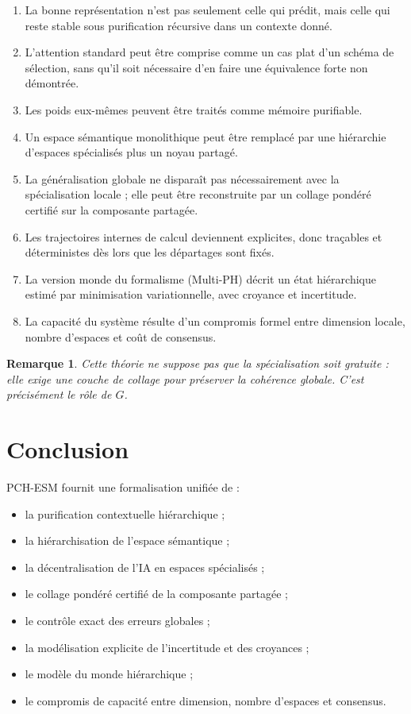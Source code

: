 \documentclass[11pt,a4paper]{article}
\newtheorem{remark}{Remarque}[section]
\newcommand{\1}{\mathbf 1}
\begin{document}
\begin{enumerate}[leftmargin=2em]
    \item La bonne représentation n'est pas seulement celle qui prédit, mais celle qui reste stable sous purification récursive dans un contexte donné.
    \item L'attention standard peut être comprise comme un cas plat d'un schéma de sélection, sans qu'il soit nécessaire d'en faire une équivalence forte non démontrée.
    \item Les poids eux-mêmes peuvent être traités comme mémoire purifiable.
    \item Un espace sémantique monolithique peut être remplacé par une hiérarchie d'espaces spécialisés plus un noyau partagé.
    \item La généralisation globale ne disparaît pas nécessairement avec la spécialisation locale ; elle peut être reconstruite par un collage pondéré certifié sur la composante partagée.
    \item Les trajectoires internes de calcul deviennent explicites, donc traçables et déterministes dès lors que les départages sont fixés.
    \item La version monde du formalisme (Multi-PH) décrit un état hiérarchique estimé par minimisation variationnelle, avec croyance et incertitude.
    \item La capacité du système résulte d'un compromis formel entre dimension locale, nombre d'espaces et coût de consensus.
\end{enumerate}

\begin{remark}
Cette théorie ne suppose pas que la spécialisation soit gratuite : elle exige une couche de collage pour préserver la cohérence globale.
C'est précisément le rôle de \(G\).
\end{remark}

\section{Conclusion}

PCH-ESM fournit une formalisation unifiée de :
\begin{itemize}[leftmargin=2em]
    \item la purification contextuelle hiérarchique ;
    \item la hiérarchisation de l'espace sémantique ;
    \item la décentralisation de l'IA en espaces spécialisés ;
    \item le collage pondéré certifié de la composante partagée ;
    \item le contrôle exact des erreurs globales ;
    \item la modélisation explicite de l'incertitude et des croyances ;
    \item le modèle du monde hiérarchique ;
    \item le compromis de capacité entre dimension, nombre d'espaces et consensus.
\end{itemize}
\end{document}
